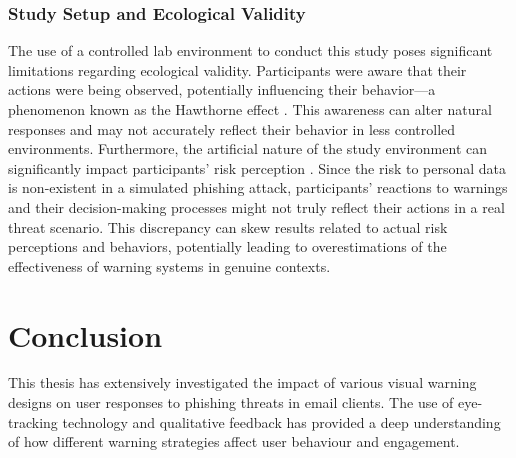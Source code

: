 \documentclass[
  a4paper,  %
  twoside,  %
  bibliography=totoc,
  headsepline,
  cleardoublepage=empty,
  parskip=half,
  draft=false
]{scrbook}
\begin{document}
\subsection{Study Setup and Ecological Validity}
The use of a controlled lab environment to conduct this study poses significant limitations regarding ecological validity. Participants were aware that their actions were being observed, potentially influencing their behavior—a phenomenon known as the Hawthorne effect \cite{jim}. This awareness can alter natural responses and may not accurately reflect their behavior in less controlled environments. \newline
Furthermore, the artificial nature of the study environment can significantly impact participants' risk perception \cite{garfinkel}. Since the risk to personal data is non-existent in a simulated phishing attack, participants' reactions to warnings and their decision-making processes might not truly reflect their actions in a real threat scenario. This discrepancy can skew results related to actual risk perceptions and behaviors, potentially leading to overestimations of the effectiveness of warning systems in genuine contexts.


\chapter{Conclusion}
\label{sec:conclusion}
This thesis has extensively investigated the impact of various visual warning designs on user responses to phishing threats in email clients. The use of eye-tracking technology and qualitative feedback has provided a deep understanding of how different warning strategies affect user behaviour and engagement.
\end{document}
